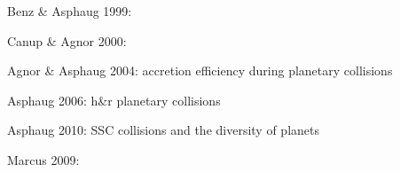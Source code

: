 \cite{Benz:1988p3336}

\cite{Benz1999Icar..142....5B}
Benz \& Asphaug 1999:

\cite{Canup:2000p3542}
Canup \& Agnor 2000:
	
\cite{Agnor:2004p3329}
Agnor \& Asphaug 2004: accretion efficiency during planetary collisions

\cite{Asphaug:2006p3729}
Asphaug 2006: h\&r planetary collisions

\cite{Asphaug:2010p3539}
Asphaug 2010: SSC collisions and the diversity of planets


\cite{2009ApJ...700L.118M}
Marcus 2009:

